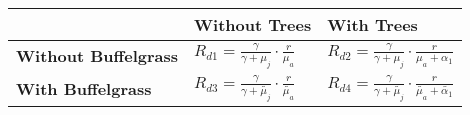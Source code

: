 \begin{tabular}{|m{2cm}|m{3cm}|m{4.5cm}|}
\hline
 & \textbf{Without Trees} &\textbf{With Trees}\\
 \hline
\textbf{Without Buffelgrass} & $R_{d1} = \displaystyle\frac{\gamma}{\gamma + \mu_j}\cdot \displaystyle\frac{r}{\mu_a}$ & $R_{d2} =\displaystyle\frac{\gamma}{ \gamma +\mu_j}\cdot \displaystyle\frac{r}{\mu_a+\alpha_1}$ \\
 \hline
\textbf{With \hspace{.4cm}  Buffelgrass} & $R_{d3} = \displaystyle\frac{\gamma}{\gamma+\tilde{\mu_j}} \cdot\displaystyle\frac{r}{\tilde{\mu_a}}$ & $R_{d4} = \displaystyle\frac{\gamma}{\gamma+\tilde{\mu_j}}\cdot\frac{r}{\tilde{\mu_a}+\tilde{\alpha_1}}$\\
 \hline
\end{tabular}